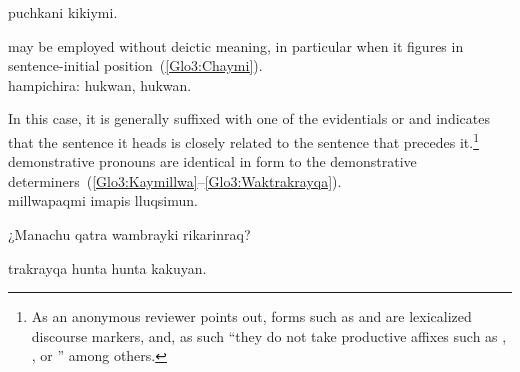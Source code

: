 %
{  puchkani kikiymi.}%
{}%
{}{}%

\noindent
{} may be employed without deictic meaning, in particular when it figures in sentence-initial position~(\ref{Glo3:Chaymi}).\\

%
{ hampichira: hukwan, hukwan.}%
{}%
{}{}%

\noindent
In this case, it is generally suffixed with one of the evidentials  or  and indicates that the sentence it heads is closely related to the sentence that precedes it.\footnote{As an anonymous reviewer points out, forms such as  and  are lexicalized discourse markers, and, as such “they do not take productive affixes such as , , or ” among others.} \SYQ{} demonstrative pronouns are identical in form to the demonstrative determiners~(\ref{Glo3:Kaymillwa}--\ref{Glo3:Waktrakrayqa}).\\

%
{ millwapaqmi imapis lluqsimun.}%
{}%
{}{}%

%
{¿Manachu  qatra wambrayki rikarinraq?}%
{}%
{}{}%

%
{ trakrayqa hunta hunta kakuyan.}%
{}%
{}{}%
 
